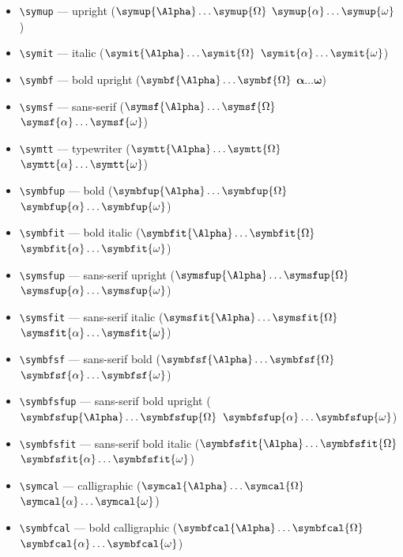 \documentclass[12pt,a4paper]{article}
\begin{document}
\begin{itemize}
    \item \texttt{\textbackslash{}symup} --- upright ($\symup{\Alpha} \ldots \symup{\Omega}$ $\symup{\alpha} \ldots \symup{\omega}$)
    \item \texttt{\textbackslash{}symit} --- italic ($\symit{\Alpha} \ldots \symit{\Omega}$ $\symit{\alpha} \ldots \symit{\omega}$)
    \item \texttt{\textbackslash{}symbf} --- bold upright ($\symbf{\Alpha} \ldots \symbf{\Omega}$ $\symbf{\alpha} \ldots \symbf{\omega}$)
    \item \texttt{\textbackslash{}symsf} --- sans-serif ($\symsf{\Alpha} \ldots \symsf{\Omega}$ $\symsf{\alpha} \ldots \symsf{\omega}$)
    \item \texttt{\textbackslash{}symtt} --- typewriter ($\symtt{\Alpha} \ldots \symtt{\Omega}$ $\symtt{\alpha} \ldots \symtt{\omega}$)
    \item \texttt{\textbackslash{}symbfup} --- bold ($\symbfup{\Alpha} \ldots \symbfup{\Omega}$ $\symbfup{\alpha} \ldots \symbfup{\omega}$)
    \item \texttt{\textbackslash{}symbfit} --- bold italic ($\symbfit{\Alpha} \ldots \symbfit{\Omega}$ $\symbfit{\alpha} \ldots \symbfit{\omega}$)
    \item \texttt{\textbackslash{}symsfup} --- sans-serif upright ($\symsfup{\Alpha} \ldots \symsfup{\Omega}$ $\symsfup{\alpha} \ldots \symsfup{\omega}$)
    \item \texttt{\textbackslash{}symsfit} --- sans-serif italic ($\symsfit{\Alpha} \ldots \symsfit{\Omega}$ $\symsfit{\alpha} \ldots \symsfit{\omega}$)
    \item \texttt{\textbackslash{}symbfsf} --- sans-serif bold ($\symbfsf{\Alpha} \ldots \symbfsf{\Omega}$ $\symbfsf{\alpha} \ldots \symbfsf{\omega}$)
    \item \texttt{\textbackslash{}symbfsfup} --- sans-serif bold upright ($\symbfsfup{\Alpha} \ldots \symbfsfup{\Omega}$ $\symbfsfup{\alpha} \ldots \symbfsfup{\omega}$)
    \item \texttt{\textbackslash{}symbfsfit} --- sans-serif bold italic ($\symbfsfit{\Alpha} \ldots \symbfsfit{\Omega}$ $\symbfsfit{\alpha} \ldots \symbfsfit{\omega}$)
    \item \texttt{\textbackslash{}symcal} --- calligraphic ($\symcal{\Alpha} \ldots \symcal{\Omega}$ $\symcal{\alpha} \ldots \symcal{\omega}$)
    \item \texttt{\textbackslash{}symbfcal} --- bold calligraphic ($\symbfcal{\Alpha} \ldots \symbfcal{\Omega}$ $\symbfcal{\alpha} \ldots \symbfcal{\omega}$)

\end{itemize}
\end{document}
